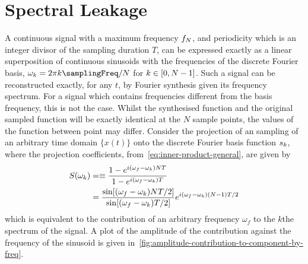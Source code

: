 \section{Spectral Leakage} %
A continuous signal with a maximum frequency $f_N$, and
periodicity which is an integer divisor of the sampling duration $T$, can
be expressed exactly as a linear superposition of continuous sinusoids
with the frequencies of the discrete Fourier basis, $\omegaSinAny = 2 \pi \dSinAnyIndex \samplingFreq / \Nsamples $ for $ k \in [0,N - 1 ]$. Such a signal can be reconstructed exactly, for any $t$, by Fourier synthesis given its frequency spectrum. For a signal which contains frequencies different from the basis frequency, this is not the case. Whilst the synthesised function and the original sampled function will be exactly identical at the $N$ sample points, the values of the function between point may differ.
Consider the projection of an sampling of an arbitrary time domain $\{x(t)\}$ onto the discrete Fourier basis function $s_k$, where the projection coefficients, from~\eqref{eq:inner-product-general}, are given by
\begin{align*} S(\omega_k) &=\equiv \frac{ 1 - e^{i (\omega_f -
\omega_k) N T} }{1 - e^{i(\omega_f - \omega_k) T}} \\ &= \frac{ \sin[(\omega_f -
\omega_k)N T / 2]}{\sin[(\omega_f - \omega_k) T / 2]} e^{i (\omega_f - \omega_k)
(N - 1) T /2}
\end{align*} which is equivalent to the contribution of an arbitrary frequency
$\omega_f$ to the $k$the spectrum of the signal. A plot of the amplitude of the
contribution against the frequency of the sinusoid is given
in~\ref{fig:amplitude-contribution-to-component-by-freq}.

